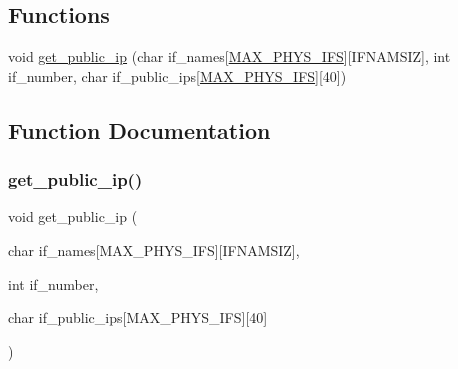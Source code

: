 \subsection*{Functions}
\begin{DoxyCompactItemize}
\item 
void \hyperlink{public-ip_8h_a035017d88204b5d04e2971a7700482e6}{get\+\_\+public\+\_\+ip} (char if\+\_\+names\mbox{[}\hyperlink{route-tree_8h_a5f66955385e84e67789d731b5cad24c7}{M\+A\+X\+\_\+\+P\+H\+Y\+S\+\_\+\+I\+FS}\mbox{]}\mbox{[}I\+F\+N\+A\+M\+S\+IZ\mbox{]}, int if\+\_\+number, char if\+\_\+public\+\_\+ips\mbox{[}\hyperlink{route-tree_8h_a5f66955385e84e67789d731b5cad24c7}{M\+A\+X\+\_\+\+P\+H\+Y\+S\+\_\+\+I\+FS}\mbox{]}\mbox{[}40\mbox{]})
\end{DoxyCompactItemize}


\subsection{Function Documentation}
\mbox{\label{public-ip_8h_a035017d88204b5d04e2971a7700482e6}} 
\subsubsection{\texorpdfstring{get\+\_\+public\+\_\+ip()}{get\_public\_ip()}}
{\footnotesize\ttfamily void get\+\_\+public\+\_\+ip (\begin{DoxyParamCaption}\item[{char}]{if\+\_\+names\mbox{[}\+M\+A\+X\+\_\+\+P\+H\+Y\+S\+\_\+\+I\+F\+S\mbox{]}\mbox{[}\+I\+F\+N\+A\+M\+S\+I\+Z\mbox{]},  }\item[{int}]{if\+\_\+number,  }\item[{char}]{if\+\_\+public\+\_\+ips\mbox{[}\+M\+A\+X\+\_\+\+P\+H\+Y\+S\+\_\+\+I\+F\+S\mbox{]}\mbox{[}40\mbox{]} }\end{DoxyParamCaption})}


